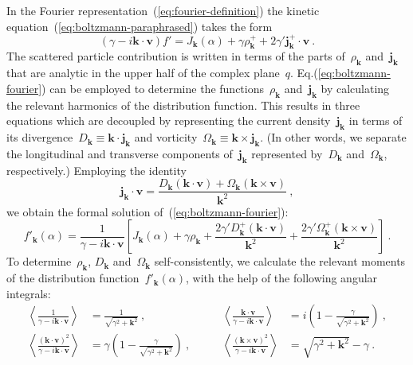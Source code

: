 \documentclass[preprint,aps,eqsecnum]{revtex4-1}
\newcommand{\fplus}[1]{{#1}^{+}}
\begin{document}
In the Fourier representation~(\ref{eq:fourier-definition}) the kinetic
equation~(\ref{eq:boltzmann-paraphrased}) takes the form
\begin{equation}
  \label{eq:boltzmann-fourier}
  (\gamma - i {\bm k} \cdot {\bm v}) f' = J_{\bm k}(\alpha)
    +   \gamma \fplus{\rho}_{\bm k}
    + 2 \gamma' \fplus{\bm j}_{\bm k} \cdot {\bm v}
\ .
\end{equation}
The scattered particle contribution is written in terms of
the parts of~$\rho_{\bm k}$ and~${\bm j}_{\bm k}$ that are analytic in the
upper half of the complex plane~$q$. Eq.(\ref{eq:boltzmann-fourier})
can be employed to determine
the functions~$\rho_{\bm k}$ and~${\bm j}_{\bm k}$ by calculating the
relevant harmonics of the distribution function. This results in three
equations which are decoupled by representing the
current density~${\bm j}_{\bm k}$ in terms of its
divergence~$D_{\bm k} \equiv {\bm k}\cdot{\bm j}_{\bm k}$
and vorticity~$\Omega_{\bm k} \equiv {\bm k} \times {\bm j}_{\bm k}$.
(In other words, we separate the longitudinal and transverse
components of~${\bm j}_{\bm k}$ represented by~$D_{\bm k}$
and~$\Omega_{\bm k}$, respectively.)
Employing the identity
\begin{equation}
  \label{eq:current-identity}
  {\bm j}_{\bm k} \cdot {\bm v} = \frac{D_{\bm k} ({\bm k} \cdot {\bm v})
    + \Omega_{\bm k} ({\bm k} \times {\bm v}) }{{\bm k}^2}
\ ,
\end{equation}
we obtain the formal solution of~(\ref{eq:boltzmann-fourier}):
\begin{equation}
  f'_{\bm k}(\alpha) = \frac{1}{\gamma - i {\bm k} \cdot{\bm v}}
  \left[ J_{\bm k}(\alpha) + \gamma\rho_{\bm k}
+   \frac{2 \gamma' \fplus{D}_{\bm k} ({\bm k} \cdot {\bm v})}{{\bm k}^2}
+  \frac{2 \gamma' \fplus{\Omega}_{\bm k} ({\bm k} \times {\bm v})}{{\bm k}^2}
  \right]
  \ .
\end{equation}
To determine~$\rho_{\bm k}$, $D_{\bm k}$ and~$\Omega_{\bm k}$
self-consistently, we calculate the relevant moments of the distribution
function~$f'_{\bm k}(\alpha)$, with the help of
 the following angular integrals:
\begin{align}
  \label{eq:angular-integrals}
  \left\langle
      \frac{1}{\gamma -i {\bm k} \cdot {\bm v}}
  \right\rangle
  &= \frac{1}{\sqrt{\gamma^2 + {\bm k}^2}}
  \ , \qquad
  &\left\langle
     \frac{{\bm k}\cdot{\bm v}}{\gamma -i {\bm k} \cdot {\bm v}}
  \right\rangle
  &= i \left(1 - \frac{\gamma}{\sqrt{\gamma^2 + {\bm k}^2}}\right)
  \ ,
\\
  \left\langle
      \frac{({\bm k}\cdot{\bm v})^2}{\gamma -i {\bm k} \cdot {\bm v}}
  \right\rangle
  &= \gamma \left(1 - \frac{\gamma}{\sqrt{\gamma^2 + {\bm k}^2}}\right) \ ,
  \qquad
  &\left\langle
     \frac{\left({\bm k}\times{\bm v}\right)^2}{\gamma -i {\bm k} \cdot {\bm v}}
  \right\rangle
  &=\sqrt{\gamma^2 + {\bm k}^2} - \gamma \ .
\nonumber
\end{align}
\end{document}
